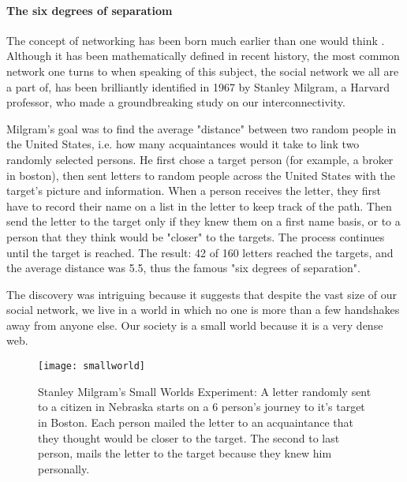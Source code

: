 \paragraph{The six degrees of separatiom}
The concept of networking has been born much earlier than one would think \cite{linked}. Although it has been mathematically defined in recent history, the most common network one turns to when speaking of this subject, the social network we all are a part of, has been brilliantly identified in 1967 by Stanley Milgram, a Harvard professor, who made a groundbreaking study on our interconnectivity.\par 
Milgram's goal was to find the average "distance" between two random people in the United States, i.e. how many acquaintances would it take to link two randomly selected persons. He first chose a target person (for example, a broker in boston), then sent letters to random people across the United States with the target's picture and information. When a person receives the letter, they first have to record their name on a list in the letter to keep track of the path. Then send the letter to the target only if they knew them on a first name basis, or to a person that they think would be "closer" to the targets. The process continues until the target is reached. The result: 42 of 160 letters reached the targets, and the average distance was 5.5, thus the famous "six degrees of separation".\par 
The discovery was intriguing because it suggests that despite the vast size of our social network, we live in a world in which no one is more than a few handshakes away from anyone else. Our society is a small world because it is a very dense web.

\begin{figure}[!h]
  \centering
  \texttt{[image: smallworld]}
  \caption{Stanley Milgram's Small Worlds Experiment: A letter randomly sent to a citizen in Nebraska starts on a 6 person's journey to it's target in Boston. Each person mailed the letter to an acquaintance that they thought would be closer to the target. The second to last person, mails the letter to the target because they knew him personally.}
  \label{fig:smallWorld}
\end{figure}



